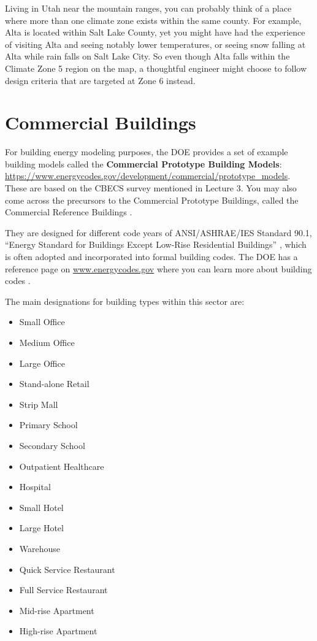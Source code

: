 \documentclass[10pt]{article}
\begin{document}
Living in Utah near the mountain ranges, you can probably think of a place where more than one climate zone exists within the same county. For example, Alta is located within Salt Lake County, yet you might have had the experience of visiting Alta and seeing notably lower temperatures, or seeing snow falling at Alta while rain falls on Salt Lake City. So even though Alta falls within the Climate Zone 5 region on the map, a thoughtful engineer might choose to follow design criteria that are targeted at Zone 6 instead.

\section{Commercial Buildings}

For building energy modeling purposes, the DOE provides a set of example building models called the \textbf{Commercial Prototype Building Models}:
\url{https://www.energycodes.gov/development/commercial/prototype_models}. These are based on the CBECS survey mentioned in Lecture 3. You may also come across the precursors to the Commercial Prototype Buildings, called the Commercial Reference Buildings \cite{noauthor_undated-hj}.

They are designed for different code years of ANSI/ASHRAE/IES Standard 90.1, ``Energy Standard for Buildings Except Low-Rise Residential Buildings'' \cite{ashrae90.1}, which is often adopted and incorporated into formal building codes. The DOE has a reference page on \url{www.energycodes.gov} where you can learn more about building codes \cite{noauthor_undated-dt}.

The main designations for building types within this sector are:
\begin{itemize}
    \setlength{\itemsep}{0pt}%
    \setlength{\parskip}{0pt}%
    \item Small Office
    \item Medium Office
    \item Large Office
    \item Stand-alone Retail
    \item Strip Mall
    \item Primary School
    \item Secondary School
    \item Outpatient Healthcare
    \item Hospital
    \item Small Hotel
    \item Large Hotel
    \item Warehouse
    \item Quick Service Restaurant
    \item Full Service Restaurant
    \item Mid-rise Apartment
    \item High-rise Apartment
\end{itemize}
\end{document}
